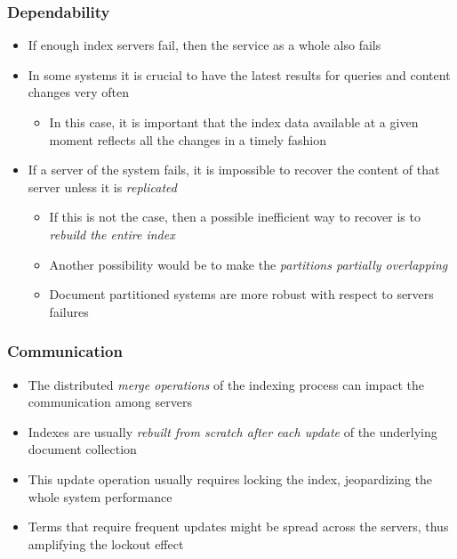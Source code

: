 \documentclass{beamer}
\begin{document}
\begin{frame}
    \frametitle{Dependability}
    
    \begin{itemize}
    \item If enough index servers fail, then the service as a whole also fails
    \item In some systems it is crucial to have the latest results for queries
        and content changes very often
        \begin{itemize}
        \item In this case, it is important that the index data available at a
            given moment reflects all the changes in a timely fashion
        \end{itemize}
    \item If a server of the system fails, it is impossible to recover the
        content of that server unless it is \emph{replicated}
        \begin{itemize}
        \item If this is not the case, then a possible inefficient way to
            recover is to \emph{rebuild the entire index}
        \item Another possibility would be to make the \emph{partitions
              partially overlapping}
        \item Document partitioned systems are more robust with respect to
            servers failures
        \end{itemize}
    \end{itemize}
\end{frame}

\begin{frame}
    \frametitle{Communication}
    
    \begin{itemize}
    \item The distributed \emph{merge operations} of the indexing process can
        impact the communication among servers
    \item Indexes are usually \emph{rebuilt from scratch after each update} of
        the underlying document collection
    \item This update operation usually requires locking the index,
        jeopardizing the whole system performance
    \item Terms that require frequent updates might be spread across the
        servers, thus amplifying the lockout effect
    \end{itemize}
\end{frame}
\end{document}
